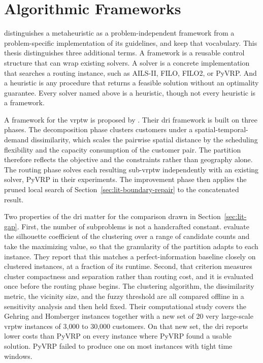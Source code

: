 \section{Algorithmic Frameworks}\label{sec:lit-frameworks}

\citet{sorensenMetaheuristicsMetaphorExposed2015} distinguishes a metaheuristic as a problem-independent framework from a problem-specific implementation of its guidelines, and \citet{sorensenHistoryMetaheuristics2018} keep that vocabulary. This thesis distinguishes three additional terms. A framework is a reusable control structure that can wrap existing solvers. A solver is a concrete implementation that searches a routing instance, such as AILS-II, FILO, FILO2, or PyVRP\@. And a heuristic is any procedure that returns a feasible solution without an optimality guarantee. Every solver named above is a heuristic, though not every heuristic is a framework.

A framework for the \gls{vrptw} is proposed by \citet{kerscherDecomposerouteimproveFrameworkSolving2025}. Their \gls{dri} framework is built on three phases. The decomposition phase clusters customers under a spatial-temporal-demand dissimilarity, which scales the pairwise spatial distance by the scheduling flexibility and the capacity consumption of the customer pair. The partition therefore reflects the objective and the constraints rather than geography alone. The routing phase solves each resulting sub-\gls{vrptw} independently with an existing solver, PyVRP in their experiments. The improvement phase then applies the pruned local search of Section~\ref{sec:lit-boundary-repair} to the concatenated result.

Two properties of the \gls{dri} matter for the comparison drawn in Section~\ref{sec:lit-gap}. First, the number of subproblems is not a handcrafted constant. \citet{kerscherDecomposerouteimproveFrameworkSolving2025} evaluate the silhouette coefficient of the clustering over a range of candidate counts and take the maximizing value, so that the granularity of the partition adapts to each instance. They report that this matches a perfect-information baseline closely on clustered instances, at a fraction of its runtime. Second, that criterion measures cluster compactness and separation rather than routing cost, and it is evaluated once before the routing phase begins. The clustering algorithm, the dissimilarity metric, the vicinity size, and the fuzzy threshold are all compared offline in a sensitivity analysis and then held fixed. Their computational study covers the Gehring and Homberger instances together with a new set of 20 very large-scale \gls{vrptw} instances of 3{,}000 to 30{,}000 customers. On that new set, the \gls{dri} reports lower costs than PyVRP on every instance where PyVRP found a usable solution. PyVRP failed to produce one on most instances with tight time windows.

